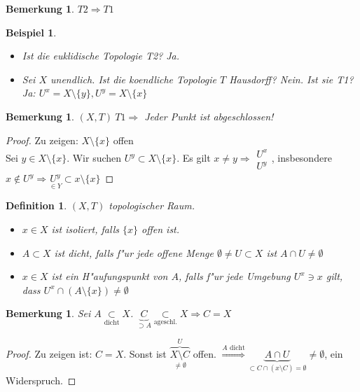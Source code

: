 \documentclass[a4paper,12pt,numbers=noenddot,parskip=full]{scrartcl}
\theoremstyle{dotless}
\newtheorem{definition}[theorem]{Definition}
\newtheorem{example}[theorem]{Beispiel}
\newtheorem{remark}[theorem]{Bemerkung}
\begin{document}
\begin{remark}
	$T2 \Rightarrow T1$
\end{remark}
\begin{example}
	\begin{itemize}
		\item Ist die euklidische Topologie T2? Ja.
		\item Sei $X$ unendlich. Ist die koendliche Topologie $T$ Hausdorff? Nein. Ist sie T1? Ja: $U^x = X \setminus \{y\}, U^y = X \setminus \{x\}$
	\end{itemize}
\end{example}
\begin{remark}
	$(X,T) ~T1 \Rightarrow$ Jeder Punkt ist abgeschlossen!
\end{remark}
\begin{proof}
	Zu zeigen: $X \setminus \{x\}$ offen\\
	Sei $y \in X \setminus \{x\}$. Wir suchen $U^y \subset X \setminus \{x\}$. Es gilt $x \neq y \Longrightarrow \begin{array}{l}
		U^x\\
		U^y
	\end{array}$, insbesondere $x \notin U^y \Longrightarrow \underset{\in Y}{U^y} \subset x \setminus \{x\}$
\end{proof}
\begin{definition}
	$(X,T)$ topologischer Raum. \begin{itemize}
		\item $x \in X$ ist \emph{isoliert}, falls $\{x\}$ offen ist.
		\item $A \subset X$ ist \emph{dicht}, falls f"ur jede offene Menge $\emptyset \neq U \subset X$ ist $A \cap U \neq \emptyset$
		\item $x \in X$ ist ein \emph{H"aufungspunkt von $A$}, falls f"ur jede Umgebung $U^x \ni x$ gilt, dass $U^x \cap (A\setminus \{x\}) \neq \emptyset$
	\end{itemize}
\end{definition}
\begin{remark}
	Sei $A \underset{\text{dicht}}{\subset} X$. $\underbrace{C}_{\supset A} \underset{\text{ageschl.}}{\subset} X \Longrightarrow C=X$
\end{remark}
\begin{proof}
	Zu zeigen ist: $C=X$. Sonst ist $\overbrace{\underset{\neq \emptyset}{X \setminus C}}^U$ offen. $\overset{A \text{ dicht}}{\Longrightarrow} \underbrace{A \cap U}_{\subset C \cap (x \setminus C) = \emptyset} \neq \emptyset$, ein Widerspruch.
\end{proof}
\end{document}

